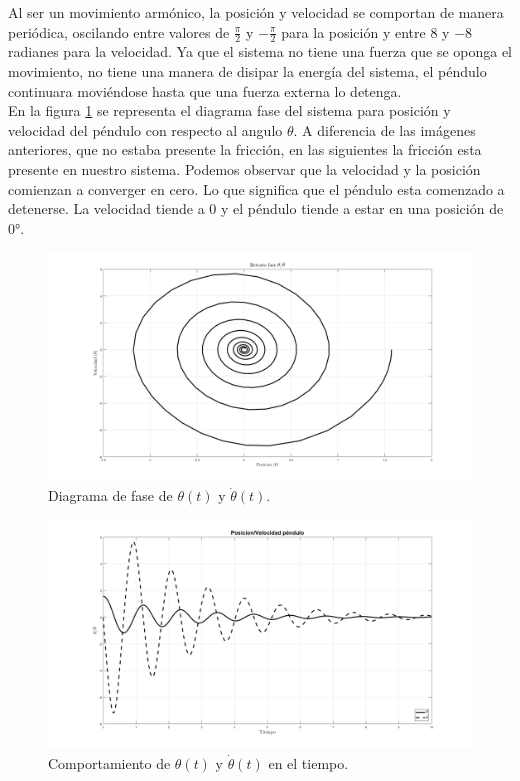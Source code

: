 Al ser un movimiento armónico, la posición y velocidad se comportan de manera periódica, oscilando entre valores de $\frac{\pi}{2}$ y $-\frac{\pi}{2}$ para la posición y entre $8$ y $-8$ radianes para la velocidad. Ya que el sistema no tiene una fuerza que se oponga el movimiento, no tiene una manera de disipar la energía del sistema, el péndulo continuara moviéndose hasta que una fuerza externa lo detenga.\\


En la figura \ref{fig: phase plot - F} se representa el diagrama fase del sistema para posición y velocidad del péndulo con respecto al angulo $\theta$. A diferencia de las imágenes anteriores, que no estaba presente la fricción, en las siguientes la fricción esta presente en nuestro sistema. Podemos observar que la velocidad y la posición comienzan a converger en cero. Lo que significa que el péndulo esta comenzado a detenerse. La velocidad tiende a $0$ y el péndulo tiende a estar en una posición de $0°$.

\begin{figure}[hb]
 \centering 
 \includegraphics[scale=0.35]{./img/faseF.png}
\caption{Diagrama de fase de $\theta(t)$ y $\dot{\theta}(t)$.}
 \label{fig: phase plot - F}
\end{figure}




\begin{figure}[hb]
 \centering 
 \includegraphics[scale=0.35]{./img/PosVelF.png}
 \caption{Comportamiento de $\theta(t)$ y $\dot{\theta}(t)$ en el tiempo.}
 \label{fig: time plot - F}
\end{figure}


